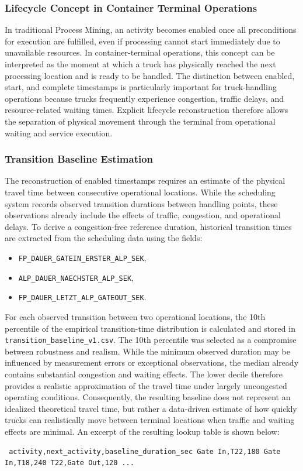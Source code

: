         \subsubsection{Lifecycle Concept in Container Terminal Operations} In traditional Process Mining, an activity becomes enabled once all preconditions for execution are fulfilled, even if processing cannot start immediately due to unavailable resources. In container-terminal operations, this concept can be interpreted as the moment at which a truck has physically reached the next processing location and is ready to be handled. The distinction between enabled, start, and complete timestamps is particularly important for truck-handling operations because trucks frequently experience congestion, traffic delays, and resource-related waiting times. Explicit lifecycle reconstruction therefore allows the separation of physical movement through the terminal from operational waiting and service execution.
        \subsubsection{Transition Baseline Estimation}
        The reconstruction of enabled timestamps requires an estimate of the physical travel time between consecutive operational locations. While the scheduling system records observed transition durations between handling points, these observations already include the effects of traffic, congestion, and operational delays. To derive a congestion-free reference duration, historical transition times are extracted from the scheduling data using the fields: 
        \begin{itemize} 
        \item \texttt{FP\_DAUER\_GATEIN\_ERSTER\_ALP\_SEK}, 
        \item \texttt{ALP\_DAUER\_NAECHSTER\_ALP\_SEK}, 
        \item \texttt{FP\_DAUER\_LETZT\_ALP\_GATEOUT\_SEK}. \end{itemize}
        For each observed transition between two operational locations, the 10th percentile of the empirical transition-time distribution is calculated and stored in \texttt{transition\_baseline\_v1.csv}. The 10th percentile was selected as a compromise between robustness and realism. While the minimum observed duration may be influenced by measurement errors or exceptional observations, the median already contains substantial congestion and waiting effects. The lower decile therefore provides a realistic approximation of the travel time under largely uncongested operating conditions. Consequently, the resulting baseline does not represent an idealized theoretical travel time, but rather a data-driven estimate of how quickly trucks can realistically move between terminal locations when traffic and waiting effects are minimal. An excerpt of the resulting lookup table is shown below: 
        \begin{verbatim} activity,next_activity,baseline_duration_sec Gate In,T22,180 Gate In,T18,240 T22,Gate Out,120 ... \end{verbatim}
        
